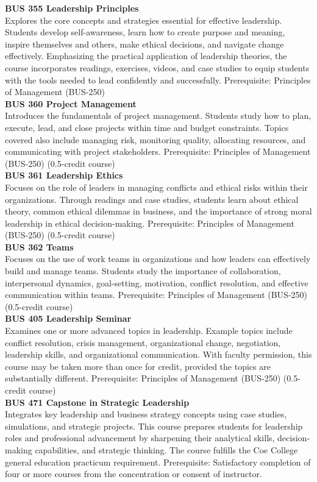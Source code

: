 \documentclass[
  letterpaper,
]{scrbook}
\begin{document}
\textbf{BUS 355 Leadership Principles}\\
Explores the core concepts and strategies essential for effective
leadership. Students develop self-awareness, learn how to create purpose
and meaning, inspire themselves and others, make ethical decisions, and
navigate change effectively. Emphasizing the practical application of
leadership theories, the course incorporates readings, exercises,
videos, and case studies to equip students with the tools needed to lead
confidently and successfully. Prerequisite: Principles of Management
(BUS-250)\\
\textbf{BUS 360 Project Management}\\
Introduces the fundamentals of project management. Students study how to
plan, execute, lead, and close projects within time and budget
constraints. Topics covered also include managing risk, monitoring
quality, allocating resources, and communicating with project
stakeholders. Prerequisite: Principles of Management (BUS-250)
(0.5-credit course)\\
\textbf{BUS 361 Leadership Ethics}\\
Focuses on the role of leaders in managing conflicts and ethical risks
within their organizations. Through readings and case studies, students
learn about ethical theory, common ethical dilemmas in business, and the
importance of strong moral leadership in ethical decision-making.
Prerequisite: Principles of Management (BUS-250) (0.5-credit course)\\
\textbf{BUS 362 Teams}\\
Focuses on the use of work teams in organizations and how leaders can
effectively build and manage teams. Students study the importance of
collaboration, interpersonal dynamics, goal-setting, motivation,
conflict resolution, and effective communication within teams.
Prerequisite: Principles of Management (BUS-250) (0.5-credit course)\\
\textbf{BUS 405 Leadership Seminar}\\
Examines one or more advanced topics in leadership. Example topics
include conflict resolution, crisis management, organizational change,
negotiation, leadership skills, and organizational communication. With
faculty permission, this course may be taken more than once for credit,
provided the topics are substantially different. Prerequisite:
Principles of Management (BUS-250) (0.5-credit course)\\
\textbf{BUS 471 Capstone in Strategic Leadership}\\
Integrates key leadership and business strategy concepts using case
studies, simulations, and strategic projects. This course prepares
students for leadership roles and professional advancement by sharpening
their analytical skills, decision-making capabilities, and strategic
thinking. The course fulfills the Coe College general education
practicum requirement. Prerequisite: Satisfactory completion of four or
more courses from the concentration or consent of instructor.
\end{document}
